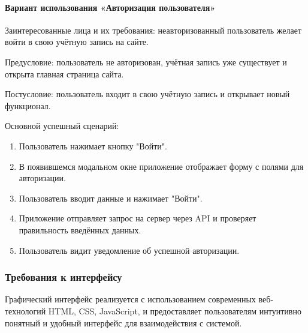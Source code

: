 \paragraph{Вариант использования «Авторизация пользователя»}

Заинтересованные лица и их требования: неавторизованный пользователь желает войти в свою учётную запись на сайте.

Предусловие: пользователь не авторизован, учётная запись уже существует и открыта главная страница сайта.

Постусловие: пользователь входит в свою учётную запись и открывает новый функционал.

Основной успешный сценарий:

\begin{enumerate}
	\item Пользователь нажимает кнопку "Войти".
	\item В появившемся модальном окне приложение отображает форму с полями для авторизации.
	\item Пользователь вводит данные и нажимает "Войти".
	\item Приложение отправляет запрос на сервер через API и проверяет правильность введённых данных.
	\item Пользователь видит уведомление об успешной авторизации. 
	
\end{enumerate}


\subsubsection{Требования к интерфейсу}

Графический интерфейс реализуется с использованием современных веб-технологий HTML, CSS, JavaScript, и предоставляет пользователям интуитивно понятный и удобный интерфейс для взаимодействия с системой. 

